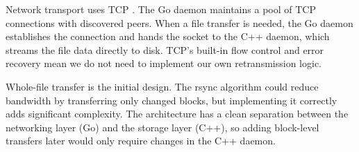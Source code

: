 Network transport uses TCP \cite{rfc9293}. The Go daemon maintains a pool of TCP connections with discovered peers. When a file transfer is needed, the Go daemon establishes the connection and hands the socket to the C++ daemon, which streams the file data directly to disk. TCP's built-in flow control and error recovery mean we do not need to implement our own retransmission logic.

Whole-file transfer is the initial design. The rsync algorithm \cite{rsync1996} could reduce bandwidth by transferring only changed blocks, but implementing it correctly adds significant complexity. The architecture has a clean separation between the networking layer (Go) and the storage layer (C++), so adding block-level transfers later would only require changes in the C++ daemon.

